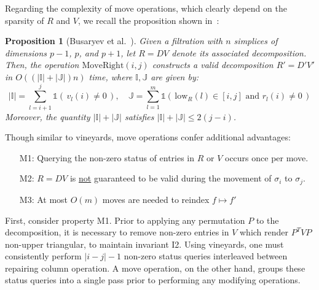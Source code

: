 \documentclass[sn-mathphys]{sn-jnl}
\newtheorem{proposition}{Proposition}
\newtheorem{remark}{Remark}
\begin{document}
Regarding the complexity of move operations, which clearly depend on the sparsity of $R$ and $V$, we recall the proposition shown in~\cite{busaryev2010tracking}: 
\begin{proposition}[Busaryev et al.~\cite{busaryev2010tracking}]\label{prop:move_st}
	Given a filtration with $n$ simplices of dimensions $p-1$, $p$, and $p+1$,    let $R = DV$ denote its associated decomposition. Then, the operation $\mathrm{MoveRight}(i,j)$ constructs a valid decomposition $R' = D'V'$ in $O((\lvert \mathbb{I} \rvert + \lvert \mathbb{J} \rvert)n)$ time, where $\mathbb{I}, \mathbb{J}$ are given by:
	$$ \lvert \mathbb{I}\rvert = \sum\limits_{l=i+1}^j \mathds{1}\left(\, v_l(i) \neq 0 \, \right), \quad \mathbb{J} = \sum\limits_{l=1}^m \mathds{1}\left(\, \mathrm{low}_R(l) \in [i,j] \text{ and } r_l(i) \neq 0 \, \right)$$
	Moreover, the quantity $\lvert \mathbb{I} \rvert + \lvert \mathbb{J} \rvert$ satisfies $\lvert \mathbb{I} \rvert + \lvert \mathbb{J} \rvert \leq 2(j - i)$. 
\end{proposition}
\noindent Though similar to vineyards, move operations confer additional advantages:
\\	
 \begin{enumerate}[labelsep=5pt, topsep=0pt,itemsep=-0.25ex,parsep=1.2ex]
 	\item[M1:] Querying the non-zero status of entries in $R$ or $V$ occurs once per move.
 	\item[M2:] $R = D V$ is \underline{not} guaranteed to be valid during the movement of $\sigma_i $ to $ \sigma_j$.
 	\item[M3:] At most $O(m)$ moves are needed to reindex $f \mapsto f'$ 
 \end{enumerate} 
 \vspace*{1em}
First, consider property M1. Prior to applying any permutation $P$ to the decomposition, it is necessary to remove non-zero entries in $V$ which render $P^TVP$ non-upper triangular, to maintain invariant I2. 
Using vineyards, one must consistently perform $\lvert i - j \rvert - 1$ non-zero status queries interleaved between repairing column operation. A move operation, on the other hand, groups these status queries into a single pass prior to performing any modifying operations. 
\end{document}
